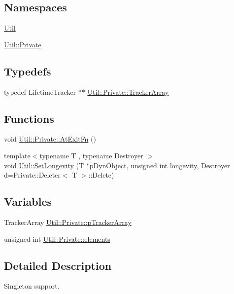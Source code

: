 \subsection*{Namespaces}
\begin{DoxyCompactItemize}
\item 
 \mbox{\hyperlink{namespaceUtil}{Util}}
\item 
 \mbox{\hyperlink{namespaceUtil_1_1Private}{Util\+::\+Private}}
\end{DoxyCompactItemize}
\subsection*{Typedefs}
\begin{DoxyCompactItemize}
\item 
typedef Lifetime\+Tracker $\ast$$\ast$ \mbox{\hyperlink{namespaceUtil_1_1Private_a51d35478cde8e0af0d19ef32c88bf016}{Util\+::\+Private\+::\+Tracker\+Array}}
\end{DoxyCompactItemize}
\subsection*{Functions}
\begin{DoxyCompactItemize}
\item 
void \mbox{\hyperlink{namespaceUtil_1_1Private_a98e2ffcf46d002cf16c15c8ab26e7818}{Util\+::\+Private\+::\+At\+Exit\+Fn}} ()
\item 
{\footnotesize template$<$typename T , typename Destroyer $>$ }\\void \mbox{\hyperlink{namespaceUtil_a3883209db7bb694594e3cbde04febb5d}{Util\+::\+Set\+Longevity}} (T $\ast$p\+Dyn\+Object, unsigned int longevity, Destroyer d=Private\+::\+Deleter$<$ T $>$\+::Delete)
\end{DoxyCompactItemize}
\subsection*{Variables}
\begin{DoxyCompactItemize}
\item 
Tracker\+Array \mbox{\hyperlink{namespaceUtil_1_1Private_ac1d3e8d33803518de43c86a09b4b2566}{Util\+::\+Private\+::p\+Tracker\+Array}}
\item 
unsigned int \mbox{\hyperlink{namespaceUtil_1_1Private_a03bf7a9b9a2685506d33cfdcb748f444}{Util\+::\+Private\+::elements}}
\end{DoxyCompactItemize}


\subsection{Detailed Description}
Singleton support. 

